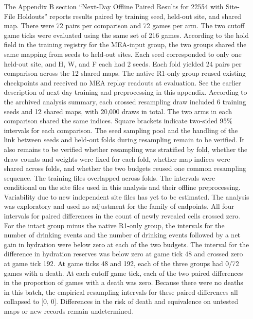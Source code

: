 \documentclass{article}
\begin{document}
The Appendix B section “Next-Day Offline Paired Results for 22554 with Site-File Holdouts” reports results paired by training seed, held-out site, and shared map. There were 72 pairs per comparison and 72 games per arm. The two cutoff game ticks were evaluated using the same set of 216 games. According to the hold field in the training registry for the MEA-input group, the two groups shared the same mapping from seeds to held-out sites. Each seed corresponded to only one held-out site, and H, W, and F each had 2 seeds. Each fold yielded 24 pairs per comparison across the 12 shared maps. The native R1-only group reused existing checkpoints and received no MEA replay readouts at evaluation. See the earlier description of next-day training and preprocessing in this appendix. According to the archived analysis summary, each crossed resampling draw included 6 training seeds and 12 shared maps, with 20,000 draws in total. The two arms in each comparison shared the same indices. Square brackets indicate two-sided 95\% intervals for each comparison. The seed sampling pool and the handling of the link between seeds and held-out folds during resampling remain to be verified. It also remains to be verified whether resampling was stratified by fold, whether the draw counts and weights were fixed for each fold, whether map indices were shared across folds, and whether the two budgets reused one common resampling sequence. The training files overlapped across folds. The intervals were conditional on the site files used in this analysis and their offline preprocessing. Variability due to new independent site files has yet to be estimated. The analysis was exploratory and used no adjustment for the family of endpoints. All four intervals for paired differences in the count of newly revealed cells crossed zero. For the intact group minus the native R1-only group, the intervals for the number of drinking events and the number of drinking events followed by a net gain in hydration were below zero at each of the two budgets. The interval for the difference in hydration reserves was below zero at game tick 48 and crossed zero at game tick 192. At game ticks 48 and 192, each of the three groups had 0/72 games with a death. At each cutoff game tick, each of the two paired differences in the proportion of games with a death was zero. Because there were no deaths in this batch, the empirical resampling intervals for these paired differences all collapsed to [0, 0]. Differences in the risk of death and equivalence on untested maps or new records remain undetermined.
\end{document}
